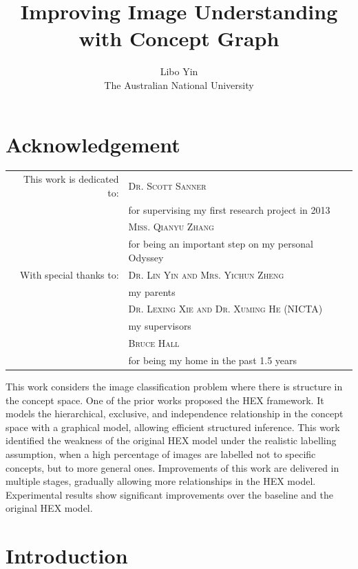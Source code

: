\documentclass[11pt,a4paper]{book}
\begin{document}
\title{Improving Image Understanding with Concept Graph}
\author{Libo Yin\\The Australian National University}
\maketitle

\chapter{Acknowledgement}

\begin{table}[htbp]
\centering
\begin{tabular}{rl}
This work is dedicated to: & \textsc{Dr. Scott Sanner}\\
 & for supervising my first research project in 2013\\
 & \textsc{Miss. Qianyu Zhang}\\
 & for being an important step on my personal Odyssey\\
With special thanks to: & \textsc{Dr. Lin Yin and Mrs. Yichun Zheng}\\
 & my parents\\
 & \textsc{Dr. Lexing Xie and Dr. Xuming He (NICTA)}\\
 & my supervisors\\
 & \textsc{Bruce Hall}\\
 & for being my home in the past 1.5 years
\end{tabular}
\end{table}

This work considers the image classification problem where there is structure in the concept space. One of the prior works proposed the HEX framework. It models the hierarchical, exclusive, and independence relationship in the concept space with a graphical model, allowing efficient structured inference. This work identified the weakness of the original HEX model under the realistic labelling assumption, when a high percentage of images are labelled not to specific concepts, but to more general ones. Improvements of this work are delivered in multiple stages, gradually allowing more relationships in the HEX model. Experimental results show significant improvements over the baseline and the original HEX model.

\chapter{Introduction}
\label{chap:intro}
\end{document}
